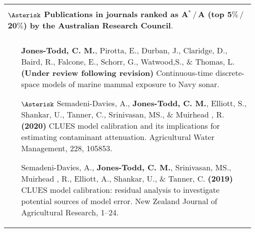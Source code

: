 \documentclass[12pt, a4paper]{article}
\begin{document}
\begin{center}\begin{longtable}{|p{16.3 cm}|}
\hline \cellcolor[gray]{0.8}{\bf 2a.  Research publications and dissemination}  \\
{\bf $\Asterisk$ Publications in journals ranked as A${}^\ast\,/\,$A (top 5$\%\,/\,$20$\%$) by the Australian Research Council}.\\
\hline \cellcolor[gray]{0.8}{Peer reviewed journal articles}  \\
\hline
\begin{itemize}
\item[] {\bf Jones-Todd, C. M.}, Pirotta, E., Durban, J., Claridge, D., Baird, R., Falcone, E., Schorr, G., Watwood,S., \& Thomas, L.  \textbf{(Under review following revision)} Continuous-time discrete-space models of marine mammal exposure to Navy sonar.
\item[$\Asterisk$] Semadeni-Davies, A., {\bf Jones-Todd, C. M.},  Elliott, S., Shankar, U., Tanner, C., Srinivasan, MS., \& Muirhead , R. {\bf(2020)} CLUES model calibration and its implications for estimating contaminant attenuation. Agricultural Water Management, 228, 105853.
  \item[] Semadeni-Davies, A., \textbf{Jones-Todd, C. M.}, Srinivasan, MS.,  Muirhead , R.,  Elliott, A., Shankar, U., \& Tanner, C. \textbf{(2019)} CLUES model calibration: residual analysis to investigate potential sources of model error. New Zealand Journal of Agricultural Research, 1--24.

\end{itemize}
\end{longtable}
\end{center}
\end{document}
